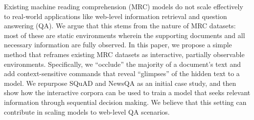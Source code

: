 Existing machine reading comprehension (MRC) models do not scale effectively to real-world applications like web-level information retrieval and question answering (QA). We argue that this stems from the nature of MRC datasets: most of these are static environments wherein the supporting documents and all necessary information are fully observed. In this paper, we propose a simple method that reframes existing MRC datasets as interactive, partially observable environments. Specifically, we ``occlude'' the majority of a document's text and add context-sensitive commands that reveal ``glimpses'' of the hidden text to a model. We repurpose SQuAD and NewsQA as an initial case study, and then show how the interactive corpora can be used to train a model that seeks relevant information through sequential decision making. We believe that this setting can contribute in scaling models to web-level QA scenarios.
